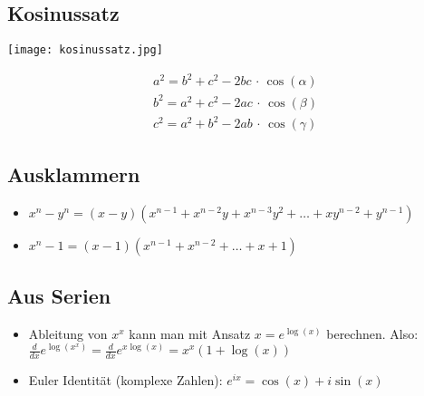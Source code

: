 \subsection{Kosinussatz}
\begin{minipage}{0.35\columnwidth}
	\texttt{[image: kosinussatz.jpg]}
\end{minipage}
\begin{minipage}{0.60\columnwidth}
	\begin{eqnarray*}
		a^2 = b^2 + c^2 - 2bc \, \cdot \, \cos(\alpha)\\
		b^2 = a^2 + c^2 - 2ac \, \cdot \, \cos(\beta)\\
		c^2 = a^2 + b^2 - 2ab \, \cdot \, \cos(\gamma)
	\end{eqnarray*}
\end{minipage}

\subsection{Ausklammern}
\begin{itemize}[leftmargin=*]
	\item $x^n - y^n = (x-y) (x^{n-1} + x^{n-2}y + x^{n-3}y^2 + \ldots + xy^{n-2}
	+ y^{n-1})$
	\item $x^n - 1 = (x-1)(x^{n-1} + x^{n-2} + \ldots + x + 1)$
\end{itemize}

\subsection{Aus Serien}
\begin{itemize}[leftmargin=*]
	\item Ableitung von $x^x$ kann man mit Ansatz $x = e^{\log(x)}$ berechnen.
	Also:$ \frac{d}{dx}  e^{\log(x^x)} = \frac{d}{dx} e^{x \log(x)} = x^x (1 + \log(x))$
	\item Euler Identität (komplexe Zahlen): $e^{ix} = \cos(x) + i \sin(x)$
\end{itemize}

